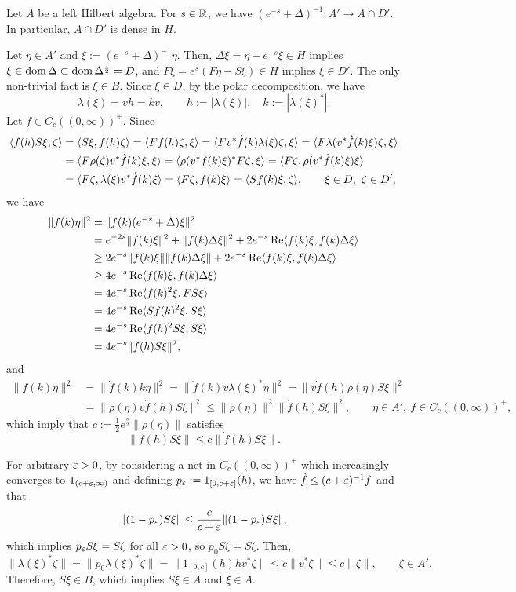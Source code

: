 \documentclass{../../../small}
\begin{document}
\begin{lem}
Let $A$ be a left Hilbert algebra.
For $s\in\mathbb{R}$, we have $(e^{-s}+\Delta)^{-1}:A'\to A\cap D'$.
In particular, $A\cap D'$ is dense in $H$.
\end{lem}
\begin{pf}
Let $\eta\in A'$ and $\xi:=(e^{-s}+\Delta)^{-1}\eta$.
Then, $\Delta\xi=\eta-e^{-s}\xi\in H$ implies $\xi\in\operatorname{dom}\Delta\subset\operatorname{dom}\Delta^{\frac12}=D$, and $F\xi=e^s(F\eta-S\xi)\in H$ implies $\xi\in D'$.
The only non-trivial fact is $\xi\in B$.
Since $\xi\in D$, by the polar decomposition, we have
\[\lambda(\xi)=vh=kv,\qquad h:=|\lambda(\xi)|,\quad k:=|\lambda(\xi)^*|.\]
Let $f\in C_c((0,\infty))^+$.
Since
\begin{align*}
\langle f(h)S\xi,\zeta\rangle
&=\langle S\xi,f(h)\zeta\rangle
=\langle Ff(h)\zeta,\xi\rangle
=\langle Fv^*\grave f(k)\lambda(\xi)\zeta,\xi\rangle
=\langle F\lambda(v^*\grave f(k)\xi)\zeta,\xi\rangle\\
&=\langle F\rho(\zeta)v^*\grave f(k)\xi,\xi\rangle
=\langle\rho(v^*\grave f(k)\xi)^*F\zeta,\xi\rangle
=\langle F\zeta,\rho(v^*\grave f(k)\xi)\xi\rangle\\
&=\langle F\zeta,\lambda(\xi)v^*\grave f(k)\xi\rangle
=\langle F\zeta,f(k)\xi\rangle
=\langle Sf(k)\xi,\zeta\rangle,\qquad\xi\in D,\ \zeta\in D',
\end{align*}
we have
\begin{align*}
\|f(k)\eta\|^2
&=\|f(k)(e^{-s}+\Delta)\xi\|^2\\
&=e^{-2s}\|f(k)\xi\|^2+\|f(k)\Delta\xi\|^2+2e^{-s}\operatorname{Re}\langle f(k)\xi,f(k)\Delta\xi\rangle\\
&\ge2e^{-s}\|f(k)\xi\|\|f(k)\Delta\xi\|+2e^{-s}\operatorname{Re}\langle f(k)\xi,f(k)\Delta\xi\rangle\\
&\ge4e^{-s}\operatorname{Re}\langle f(k)\xi,f(k)\Delta\xi\rangle\\
&=4e^{-s}\operatorname{Re}\langle f(k)^2\xi,FS\xi\rangle\\
&=4e^{-s}\operatorname{Re}\langle Sf(k)^2\xi,S\xi\rangle\\
&=4e^{-s}\operatorname{Re}\langle f(h)^2S\xi,S\xi\rangle\\
&=4e^{-s}\|f(h)S\xi\|^2,
\end{align*}
and
\begin{align*}
\|f(k)\eta\|^2
&=\|\grave f(k)k\eta\|^2
=\|\grave f(k)v\lambda(\xi)^*\eta\|^2
=\|v\grave f(h)\rho(\eta)S\xi\|^2\\
&=\|\rho(\eta)v\grave f(h)S\xi\|^2
\le\|\rho(\eta)\|^2\|\grave f(h)S\xi\|^2,\qquad\eta\in A',\ f\in C_c((0,\infty))^+,
\end{align*}
which imply that $c:=\frac12e^{\frac s2}\|\rho(\eta)\|$ satisfies
\[\|f(h)S\xi\|\le c\|\grave f(h)S\xi\|.\]

For arbitrary $\varepsilon>0$, by considering a net in $C_c((0,\infty))^+$ which increasingly converges to $1_{(c+\varepsilon,\infty)}$ and defining $p_\varepsilon:=1_{[0,c+\varepsilon]}(h)$, we have $\grave f\le(c+\varepsilon)^{-1}f$ and that
\[\|(1-p_\varepsilon)S\xi\|\le\frac c{c+\varepsilon}\|(1-p_\varepsilon)S\xi\|,\]
which implies $p_\varepsilon S\xi=S\xi$ for all $\varepsilon>0$, so $p_0S\xi=S\xi$.
Then,
\[\|\lambda(\xi)^*\zeta\|=\|p_0\lambda(\xi)^*\zeta\|=\|1_{[0,c]}(h)hv^*\zeta\|\le c\|v^*\zeta\|\le c\|\zeta\|,\qquad\zeta\in A'.\]
Therefore, $S\xi\in B$, which implies $S\xi\in A$ and $\xi\in A$.


\end{pf}
\end{document}
